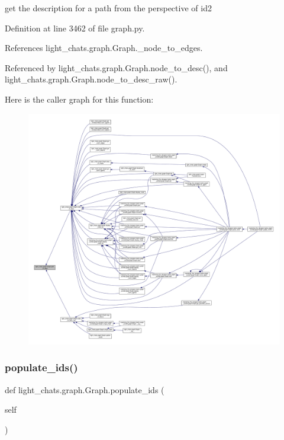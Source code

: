 \begin{DoxyVerb}get the description for a path from the perspective of id2\end{DoxyVerb}
 

Definition at line 3462 of file graph.\+py.



References light\+\_\+chats.\+graph.\+Graph.\+\_\+node\+\_\+to\+\_\+edges.



Referenced by light\+\_\+chats.\+graph.\+Graph.\+node\+\_\+to\+\_\+desc(), and light\+\_\+chats.\+graph.\+Graph.\+node\+\_\+to\+\_\+desc\+\_\+raw().

Here is the caller graph for this function\+:
\nopagebreak
\begin{figure}[H]
\begin{center}
\leavevmode
\includegraphics[width=350pt]{classlight__chats_1_1graph_1_1Graph_afd47e9b4f058dc2cbb520164db920664_icgraph}
\end{center}
\end{figure}
\mbox{\label{classlight__chats_1_1graph_1_1Graph_a604091edb800be1aad16f3a64f13d6da}} 
\subsubsection{\texorpdfstring{populate\+\_\+ids()}{populate\_ids()}}
{\footnotesize\ttfamily def light\+\_\+chats.\+graph.\+Graph.\+populate\+\_\+ids (\begin{DoxyParamCaption}\item[{}]{self }\end{DoxyParamCaption})}



